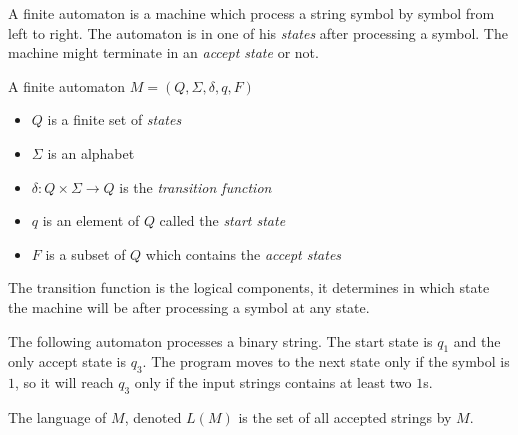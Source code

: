\documentclass{article}
\begin{document}
A finite automaton is a machine which process a string
symbol by symbol from left to right. The automaton is in one of his \textit{states}
after processing a symbol. The machine might terminate in an
\textit{accept state} or not.

A finite automaton \(M=(Q, \Sigma, \delta, q, F)\)
\begin{itemize}
    \item \(Q\) is a finite set of \textit{states}
    \item \(\Sigma\) is an alphabet
    \item \(\delta : Q \times \Sigma \to Q\) is the \textit{transition function}
    \item \(q\) is an element of \(Q\) called the \textit{start state}
    \item \(F\) is a subset of \(Q\) which contains the \textit{accept states}
\end{itemize}
The transition function is the logical components, it determines
in which state the machine will be after processing a symbol at any state.

The following automaton processes a binary string.
The start state is \(q_1\) and the only accept state is \(q_3\).
The program moves to the next state only if the symbol is \(1\),
so it will reach \(q_3\) only if the input strings contains at least two \(1\)s.
\begin{center}
\end{center}

\pagebreak

The language of \(M\), denoted \(L(M)\) is the set of all accepted strings
by \(M\).
\end{document}
